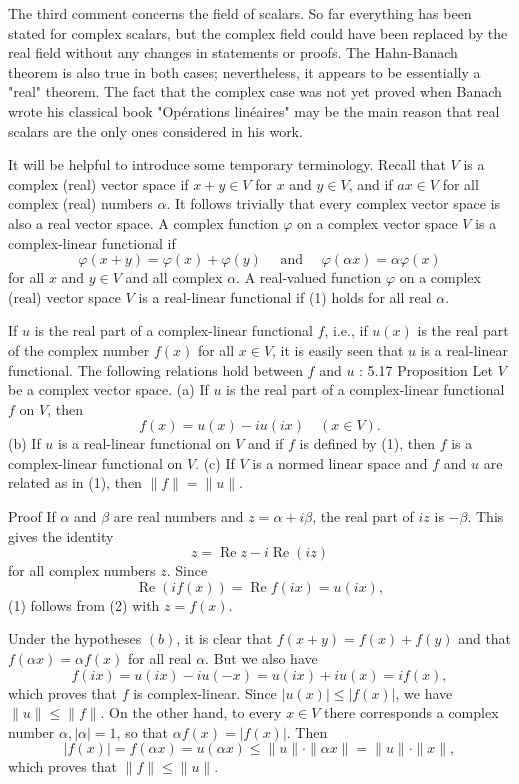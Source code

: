 The third comment concerns the field of scalars. So far everything has been stated for complex scalars, but the complex field could have been replaced by the real field without any changes in statements or proofs. The Hahn-Banach theorem is also true in both cases; nevertheless, it appears to be essentially a "real" theorem. The fact that the complex case was not yet proved when Banach wrote his classical book "Opérations linéaires" may be the main reason that real scalars are the only ones considered in his work.

It will be helpful to introduce some temporary terminology. Recall that $V$ is a complex (real) vector space if $x+y \in V$ for $x$ and $y \in V$, and if $a x \in V$ for all complex (real) numbers $\alpha$. It follows trivially that every complex vector space is also a real vector space. A complex function $\varphi$ on a complex vector space $V$ is a complex-linear functional if
$$
\varphi(x+y)=\varphi(x)+\varphi(y) \quad \text { and } \quad \varphi(\alpha x)=\alpha \varphi(x)
$$
for all $x$ and $y \in V$ and all complex $\alpha$. A real-valued function $\varphi$ on a complex (real) vector space $V$ is a real-linear functional if (1) holds for all real $\alpha$.

If $u$ is the real part of a complex-linear functional $f$, i.e., if $u(x)$ is the real part of the complex number $f(x)$ for all $x \in V$, it is easily seen that $u$ is a real-linear functional. The following relations hold between $f$ and $u$ :
5.17 Proposition Let $V$ be a complex vector space.
(a) If $u$ is the real part of a complex-linear functional $f$ on $V$, then
$$
f(x)=u(x)-i u(i x) \quad(x \in V) .
$$
(b) If $u$ is a real-linear functional on $V$ and if $f$ is defined by (1), then $f$ is a complex-linear functional on $V$.
(c) If $V$ is a normed linear space and $f$ and $u$ are related as in (1), then $\|f\|=\|u\|$.

Proof If $\alpha$ and $\beta$ are real numbers and $z=\alpha+i \beta$, the real part of $i z$ is $-\beta$. This gives the identity
$$
z=\operatorname{Re} z-i \operatorname{Re}(i z)
$$
for all complex numbers $z$. Since
$$
\operatorname{Re}(i f(x))=\operatorname{Re} f(i x)=u(i x),
$$
(1) follows from (2) with $z=f(x)$.

Under the hypotheses $(b)$, it is clear that $f(x+y)=f(x)+f(y)$ and that $f(\alpha x)=\alpha f(x)$ for all real $\alpha$. But we also have
$$
f(i x)=u(i x)-i u(-x)=u(i x)+i u(x)=i f(x),
$$
which proves that $f$ is complex-linear.
Since $|u(x)| \leq|f(x)|$, we have $\|u\| \leq\|f\|$. On the other hand, to every $x \in V$ there corresponds a complex number $\alpha,|\alpha|=1$, so that $\alpha f(x)=|f(x)|$. Then
$$
|f(x)|=f(\alpha x)=u(\alpha x) \leq\|u\| \cdot\|\alpha x\|=\|u\| \cdot\|x\|,
$$
which proves that $\|f\| \leq\|u\|$.

